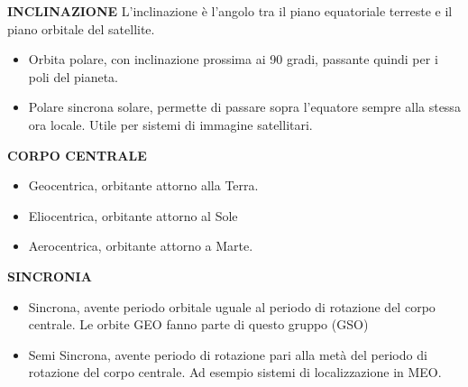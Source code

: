 \documentclass[12pt,a4paper,oneside]{book}
\begin{document}
			{\large \bf INCLINAZIONE}	
			L'inclinazione è l'angolo tra il piano equatoriale terreste e il piano orbitale del satellite.
			\begin{itemize}
				\item Orbita polare, con inclinazione prossima ai 90 gradi, passante quindi per i poli del pianeta.
				\item Polare sincrona solare, permette di passare sopra l'equatore sempre alla stessa ora locale. Utile per sistemi di immagine satellitari.
			\end{itemize}
			
			{\large \bf CORPO CENTRALE}	
			\begin{itemize}
				\item Geocentrica, orbitante attorno alla Terra.
				\item Eliocentrica, orbitante attorno al Sole
				\item Aerocentrica, orbitante attorno a Marte.
			\end{itemize}
		
		
			{\large \bf SINCRONIA}	
			\begin{itemize}
				\item Sincrona, avente periodo orbitale uguale al periodo di rotazione del corpo centrale. Le orbite GEO fanno parte di questo gruppo (GSO)
				\item Semi Sincrona, avente periodo di rotazione pari alla metà del periodo di rotazione del corpo centrale. Ad esempio sistemi di localizzazione in MEO.
			\end{itemize}
			
						
\end{document}
